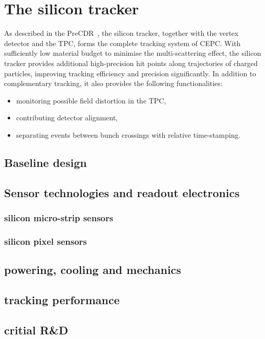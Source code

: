 \chapter{The silicon tracker}
\label{Chapter:SiTracker}

As described in the PreCDR~\cite{cepc:preCDR-1}, the silicon tracker,
together with the vertex detector and the TPC, forms the complete
tracking system of CEPC. With sufficiently low material budget to
minimise the multi-scattering effect, the silicon tracker provides
additional high-precision hit points along trajectories of charged
particles, improving tracking efficiency and precision significantly.
In addition to complementary tracking, it also provides the following
functionalities:
\begin{itemize}
\item monitoring possible field distortion in the TPC,
\item contributing detector alignment,
\item separating events between bunch crossings with relative
  time-stamping.
\end{itemize}


\section{Baseline design}


\section{Sensor technologies and readout electronics}


\subsection{silicon micro-strip sensors}


\subsection{silicon pixel sensors}


\section{powering, cooling and mechanics}


\section{tracking performance}


\section{critial R\&D}




